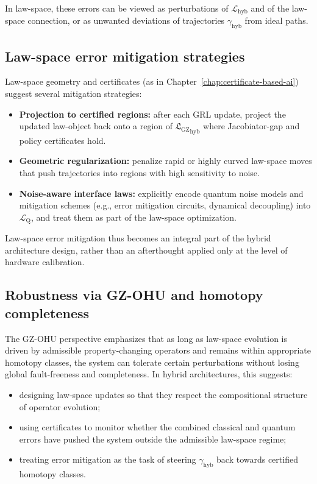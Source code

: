 \documentclass[11pt]{book}
\newcommand{\GZLS}{\ensuremath{\mathfrak{L}_{\mathrm{GZ}}}}
\theoremstyle{plain}
\theoremstyle{definition}
\theoremstyle{remark}
\begin{document}
In law-space, these errors can be viewed as perturbations of
$\mathcal{L}_{\mathrm{hyb}}$ and of the law-space connection, or
as unwanted deviations of trajectories $\gamma_{\mathrm{hyb}}$ from
ideal paths.

\subsection*{Law-space error mitigation strategies}

Law-space geometry and certificates (as in
Chapter~\ref{chap:certificate-based-ai}) suggest several mitigation
strategies:

\begin{itemize}
  \item \textbf{Projection to certified regions:}
        after each GRL update, project the updated law-object back
        onto a region of ${\GZLS}_{\mathrm{hyb}}$ where Jacobiator-gap
        and policy certificates hold.
  \item \textbf{Geometric regularization:}
        penalize rapid or highly curved law-space moves that push
        trajectories into regions with high sensitivity to noise.
  \item \textbf{Noise-aware interface laws:}
        explicitly encode quantum noise models and mitigation
        schemes (e.g., error mitigation circuits, dynamical
        decoupling) into $\mathcal{L}_{\mathrm{Q}}$, and treat them
        as part of the law-space optimization.
\end{itemize}

Law-space error mitigation thus becomes an integral part of the
hybrid architecture design, rather than an afterthought applied
only at the level of hardware calibration.

\subsection*{Robustness via GZ-OHU and homotopy completeness}

The GZ-OHU perspective emphasizes that as long as law-space
evolution is driven by admissible property-changing operators and
remains within appropriate homotopy classes, the system can tolerate
certain perturbations without losing global fault-freeness and
completeness. In hybrid architectures, this suggests:
\begin{itemize}
  \item designing law-space updates so that they respect the
        compositional structure of operator evolution;
  \item using certificates to monitor whether the combined classical
        and quantum errors have pushed the system outside the
        admissible law-space regime;
  \item treating error mitigation as the task of steering
        $\gamma_{\mathrm{hyb}}$ back towards certified homotopy
        classes.
\end{itemize}
\end{document}
